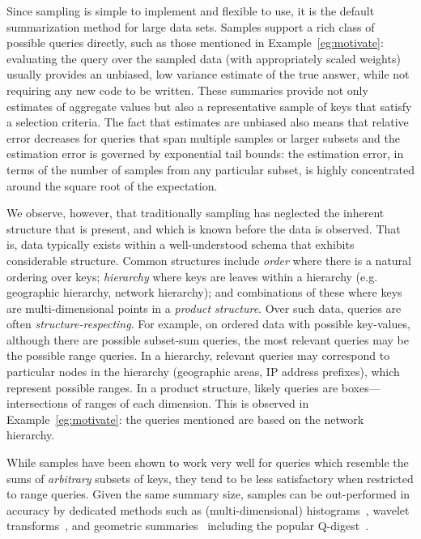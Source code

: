 \documentclass[11pt]{article}
\begin{document}
Since sampling is simple to implement and flexible to use, it is
 the default summarization method for large data sets. 
Samples support a rich class of possible queries directly, such as
those mentioned in Example~\ref{eg:motivate}:
evaluating the query over the sampled data (with appropriately
scaled weights) usually provides an unbiased, low variance estimate of
the true answer, while not requiring any new code to be written. 
These summaries provide not only estimates of aggregate
values but also a representative sample of keys that satisfy a
selection criteria.  
The fact that estimates are unbiased also means that relative
error decreases for queries that span multiple
samples or larger subsets and the estimation error is governed by
exponential tail bounds:  the estimation error, in terms of the number
of samples from any particular subset, is highly concentrated around
the square root of the expectation.

We observe, however, that traditionally sampling
has neglected the inherent structure that is present,
 and which is known before the data is observed. 
That is, data typically exists within a well-understood schema 
that exhibits considerable structure. 
Common structures include {\em order} where there is a natural ordering
over keys; {\em hierarchy} where keys are leaves within a hierarchy
(e.g. geographic hierarchy, network hierarchy); and
combinations of these where keys are multi-dimensional points in a 
{\em product structure}.
Over such data, queries are often {\em structure-respecting}.  
For example, on ordered data with  possible key-values, 
although there are  possible subset-sum queries, 
the most relevant queries may be the  possible range queries. 
In a hierarchy, relevant queries may correspond to particular nodes 
in the hierarchy
(geographic areas, IP address prefixes), which represent
 possible ranges. In a product structure, likely queries are 
boxes---intersections of ranges of each dimension. 
This is observed in Example~\ref{eg:motivate}: the queries mentioned
are based on the network hierarchy. 

While samples have been shown to work very well for queries which
resemble the sums of {\em arbitrary} subsets of keys, 
they tend to be less satisfactory when restricted to range queries. 
Given the same summary size, samples can be out-performed in
accuracy by dedicated methods such as 
(multi-dimensional) histograms~\cite{GKTD:sigmod2000,PoosalaIoannidis:VLDB97,LKC:sigmod1999},
wavelet
transforms~\cite{Matias98wavelet-basedhistograms,Vitter98datacube},
and geometric
summaries~\cite{SuriTZ:CG2004,HSST:ISAAC04,BCEG:ToA2007,HHH:CKMS:TKDD2008,ZSSDC:IMC04}
including the popular 
Q-digest~\cite{ShrivastavaBAS:sensys04}.
\end{document}
